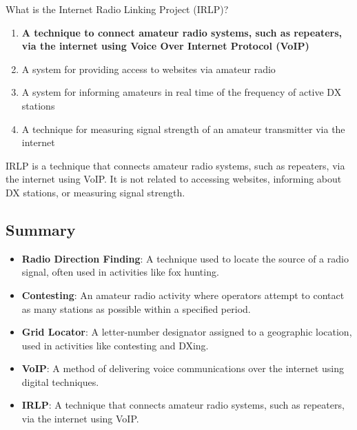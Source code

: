 
\begin{tcolorbox}[colback=gray!10!white,colframe=black!75!black,title={T8C08}]
    What is the Internet Radio Linking Project (IRLP)?
    \begin{enumerate}[label=\Alph*),noitemsep]
        \item \textbf{A technique to connect amateur radio systems, such as repeaters, via the internet using Voice Over Internet Protocol (VoIP)}
        \item A system for providing access to websites via amateur radio
        \item A system for informing amateurs in real time of the frequency of active DX stations
        \item A technique for measuring signal strength of an amateur transmitter via the internet
    \end{enumerate}
\end{tcolorbox}
IRLP is a technique that connects amateur radio systems, such as repeaters, via the internet using VoIP. It is not related to accessing websites, informing about DX stations, or measuring signal strength.


\subsection*{Summary}
\begin{itemize}
    \item \textbf{Radio Direction Finding}: A technique used to locate the source of a radio signal, often used in activities like fox hunting.
    \item \textbf{Contesting}: An amateur radio activity where operators attempt to contact as many stations as possible within a specified period.
    \item \textbf{Grid Locator}: A letter-number designator assigned to a geographic location, used in activities like contesting and DXing.
    \item \textbf{VoIP}: A method of delivering voice communications over the internet using digital techniques.
    \item \textbf{IRLP}: A technique that connects amateur radio systems, such as repeaters, via the internet using VoIP.
\end{itemize}
